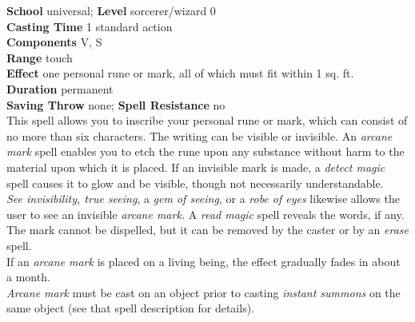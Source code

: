 \textbf{School} universal; \textbf{Level} sorcerer/wizard 0\\
\textbf{Casting Time} 1 standard action\\
\textbf{Components} V, S\\
\textbf{Range} touch\\
\textbf{Effect} one personal rune or mark, all of which must fit within 1 sq. ft.\\
\textbf{Duration} permanent\\
\textbf{Saving Throw} none; \textbf{Spell Resistance} no\\
This spell allows you to inscribe your personal rune or mark, which can consist of no more than six characters. The writing can be visible or invisible. An \textit{arcane mark }spell enables you to etch the rune upon any substance without harm to the material upon which it is placed. If an invisible mark is made, a \textit{detect magic }spell causes it to glow and be visible, though not necessarily understandable.\\
\textit{See invisibility, true seeing}, a \textit{gem of seeing}, or a \textit{robe of eyes }likewise allows the user to see an invisible \textit{arcane mark. }A \textit{read magic }spell reveals the words, if any. The mark cannot be dispelled, but it can be removed by the caster or by an \textit{erase }spell.\\
If an \textit{arcane mark }is placed on a living being, the effect gradually fades in about a month.\\
\textit{Arcane mark }must be cast on an object prior to casting \textit{instant summons }on the same object (see that spell description for details).\\
